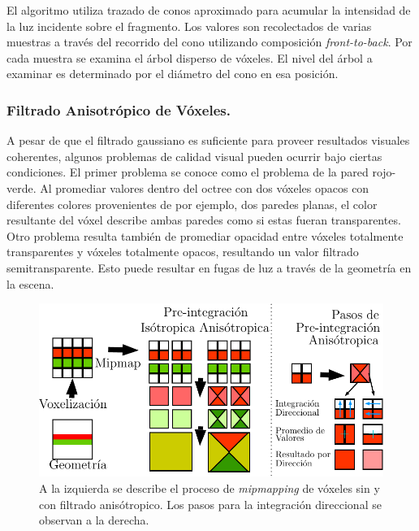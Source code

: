 El algoritmo utiliza trazado de conos aproximado para acumular la intensidad de la luz incidente sobre el fragmento. Los valores son recolectados de varias muestras a través del recorrido del cono utilizando composición \emph{front-to-back}. Por cada muestra se examina el árbol disperso de vóxeles. El nivel del árbol a examinar es determinado por el diámetro del cono en esa posición.


\subsubsection{Filtrado Anisotrópico de Vóxeles.}
\label{subsub:aniso_voxels_orig}
A pesar de que el filtrado gaussiano es suficiente para proveer resultados visuales coherentes, algunos problemas de calidad visual pueden ocurrir bajo ciertas condiciones. El primer problema se conoce como el problema de la pared rojo-verde. Al promediar valores dentro del octree con dos vóxeles opacos con diferentes colores provenientes de por ejemplo, dos paredes planas, el color resultante del vóxel describe ambas paredes como si estas fueran transparentes. Otro problema resulta también de promediar opacidad entre vóxeles totalmente transparentes y vóxeles totalmente opacos, resultando un valor filtrado semitransparente. Esto puede resultar en fugas de luz a través de la geometría en la escena.

\begin{figure}[H]
	\centering
	\includegraphics[width=0.90\linewidth]{media/isotropic_cropped.pdf}
	\caption{A la izquierda se describe el proceso de \emph{mipmapping} de vóxeles sin y con filtrado anisótropico. Los pasos para la integración direccional se observan a la derecha.}
	\label{fig:vct_anisofiltering}
\end{figure}

